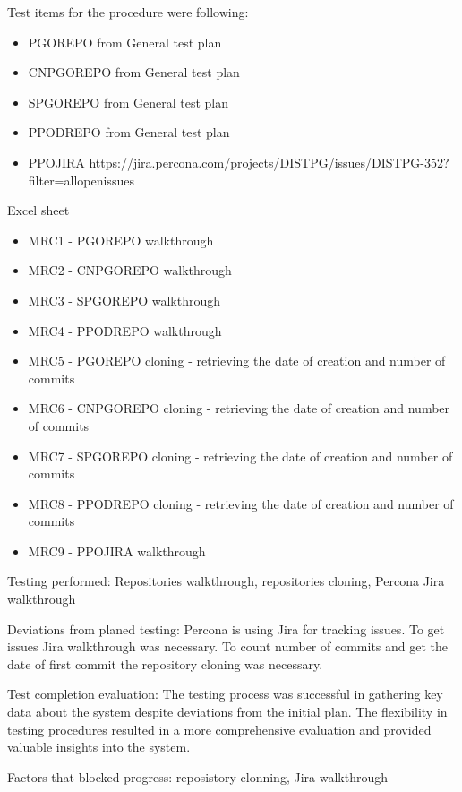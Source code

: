 Test items for the procedure were following:
\begin{itemize}
    \item PGOREPO from General test plan
    \item CNPGOREPO from General test plan
    \item SPGOREPO from General test plan
    \item PPODREPO from General test plan
    \item PPOJIRA https://jira.percona.com/projects/DISTPG/issues/DISTPG-352?filter=allopenissues
\end{itemize}

Excel sheet

\begin{itemize}
    \item MRC1 - PGOREPO walkthrough
    \item MRC2 - CNPGOREPO walkthrough
    \item MRC3 - SPGOREPO walkthrough
    \item MRC4 - PPODREPO walkthrough
    \item MRC5 - PGOREPO cloning - retrieving the date of creation and number of commits
    \item MRC6 - CNPGOREPO cloning - retrieving the date of creation and number of commits
    \item MRC7 - SPGOREPO cloning - retrieving the date of creation and number of commits
    \item MRC8 - PPODREPO cloning - retrieving the date of creation and number of commits
    \item MRC9 - PPOJIRA walkthrough
\end{itemize}

Testing performed: Repositories walkthrough, repositories cloning, Percona Jira walkthrough

Deviations from planed testing: Percona is using Jira for tracking issues. To get issues Jira walkthrough was necessary. To count number of commits and get the date of first commit the repository cloning was necessary.

Test completion evaluation: The testing process was successful in gathering key data about the system despite deviations from the initial plan. The flexibility in testing procedures resulted in a more comprehensive evaluation and provided valuable insights into the system.

Factors that blocked progress: reposistory clonning, Jira walkthrough

